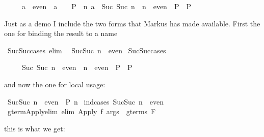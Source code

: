 \begin{isabellebody}
\begin{isamarkuptext}
\begin{isabelle}%
\ \ \ \ \ a\ {\isasymin}\ even\ {\isasymLongrightarrow}\ {\isacharparenleft}a\ {\isacharequal}\ {}\ {\isasymLongrightarrow}\ P{\isacharparenright}\ {\isasymLongrightarrow}\ {\isacharparenleft}{\isasymAnd}n{\isachardot}\ a\ {\isacharequal}\ Suc\ {\isacharparenleft}Suc\ n{\isacharparenright}\ {\isasymLongrightarrow}\ n\ {\isasymin}\ even\ {\isasymLongrightarrow}\ P{\isacharparenright}\ {\isasymLongrightarrow}\ P%
\end{isabelle}

Just as a demo I include
the two forms that Markus has made available. First the one for binding the
result to a name%
\end{isamarkuptext}%
\ Suc{\isacharunderscore}Suc{\isacharunderscore}cases\ {\isacharbrackleft}elim{\isacharbang}{\isacharbrackright}{\isacharcolon}\isanewline
\ \ {\isachardoublequote}Suc{\isacharparenleft}Suc\ n{\isacharparenright}\ {\isasymin}\ even{\isachardoublequote}\isanewline
\isanewline
{}\ Suc{\isacharunderscore}Suc{\isacharunderscore}cases%
\begin{isamarkuptext}%
\begin{isabelle}%
\ \ \ \ \ Suc\ {\isacharparenleft}Suc\ n{\isacharparenright}\ {\isasymin}\ even\ {\isasymLongrightarrow}\ {\isacharparenleft}n\ {\isasymin}\ even\ {\isasymLongrightarrow}\ P{\isacharparenright}\ {\isasymLongrightarrow}\ P%
\end{isabelle}

and now the one for local usage:%
\end{isamarkuptext}%
\ {\isachardoublequote}Suc{\isacharparenleft}Suc\ n{\isacharparenright}\ {\isasymin}\ even\ {\isasymLongrightarrow}\ P\ n{\isachardoublequote}\isanewline
{}\ {\isacharparenleft}ind{\isacharunderscore}cases\ {\isachardoublequote}Suc{\isacharparenleft}Suc\ n{\isacharparenright}\ {\isasymin}\ even{\isachardoublequote}{\isacharparenright}\isanewline
{}\isanewline
\isanewline
{}\ gterm{\isacharunderscore}Apply{\isacharunderscore}elim\ {\isacharbrackleft}elim{\isacharbang}{\isacharbrackright}{\isacharcolon}\ {\isachardoublequote}Apply\ f\ args\ {\isasymin}\ gterms\ F{\isachardoublequote}%
\begin{isamarkuptext}%
this is what we get:


\end{isamarkuptext}
\end{isabellebody}
